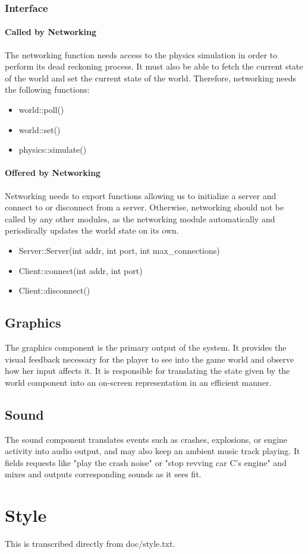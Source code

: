 \documentclass[12pt]{article}
\begin{document}
\subsubsection{Interface}

\paragraph{Called by Networking}
The networking function needs access to the physics simulation in order to perform its dead reckoning process.  It must also be able to fetch the current state of the world and set the current state of the world.  Therefore, networking needs the following functions:
\begin{itemize} 
\item world::poll()
\item world::set()
\item physics::simulate()
\end{itemize}

\paragraph{Offered by Networking}
Networking needs to export functions allowing us to initialize a server and connect to or disconnect from a server.  Otherwise, networking should not be called by any other modules, as the networking module automatically and periodically updates the world state on its own.
\begin{itemize}
\item Server::Server(int addr, int port, int max\_connections)
\item Client::connect(int addr, int port)
\item Client::disconnect()
\end{itemize}

\subsection{Graphics}
The graphics component is the primary output of the system. It provides the
visual feedback necessary for the player to see into the game world and observe
how her input affects it. It is responsible for translating the state given
by the world component into an on-screen representation in an efficient manner.
\subsection{Sound}
The sound component translates events such as crashes, explosions, or engine
activity into audio output, and may also keep an ambient music track playing.
It fields requests like "play the crash noise" or "stop revving car C's engine"
and mixes and outputs corresponding sounds as it sees fit.

\section{Style}
This is transcribed directly from doc/style.txt.


\end{document}
